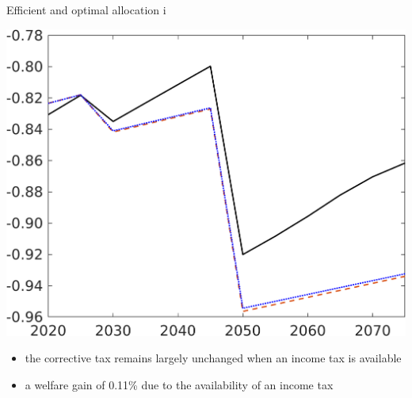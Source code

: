\documentclass[11pt,aspectratio=169]{beamer}
\begin{document}
\begin{frame}{Efficient and optimal allocation i}
\begin{minipage}[]{0.32\textwidth}
	\includegraphics[width=1\textwidth]{../codding_model/own_basedOnFried/optimalPol_elastS_DisuSci/figures/all_1705/SWF_CompEffOPT_T_NoTaus_spillover0_noskill0_sep1_BN0_ineq0_red0_xgrowth0_zero0_countec0_etaa0.79_lgd0.png}
\end{minipage}

\vspace{6mm}
\begin{itemize}
	\item the corrective tax remains largely unchanged when an income tax is available
	\vspace{2mm}
	\item<2-> a welfare gain of 0.11\% due to  the availability of an income tax
\end{itemize}
\end{frame}
\end{document}
